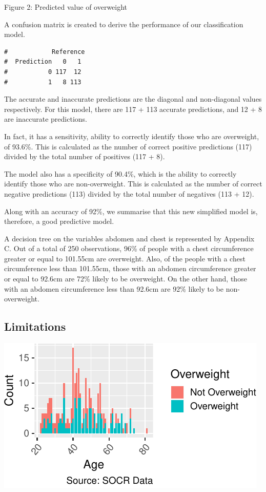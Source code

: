\documentclass[a4paper,9pt,twocolumn,twoside,]{pinp}
\begin{document}
Figure 2: Predicted value of overweight

A confusion matrix is created to derive the performance of our
classification model.

\begin{ShadedResult}
\begin{verbatim}
#            Reference
#  Prediction   0   1
#           0 117  12
#           1   8 113
\end{verbatim}
\end{ShadedResult}

The accurate and inaccurate predictions are the diagonal and
non-diagonal values respectively. For this model, there are 117 + 113
accurate predictions, and 12 + 8 are inaccurate predictions.

In fact, it has a sensitivity, ability to correctly identify those who
are overweight, of 93.6\%. This is calculated as the number of correct
positive predictions (117) divided by the total number of positives (117
+ 8).

The model also has a specificity of 90.4\%, which is the ability to
correctly identify those who are non-overweight. This is calculated as
the number of correct negative predictions (113) divided by the total
number of negatives (113 + 12).

Along with an accuracy of 92\%, we summarise that this new simplified
model is, therefore, a good predictive model.

A decision tree on the variables abdomen and chest is represented by
Appendix C. Out of a total of 250 observations, 96\% of people with a
chest circumference greater or equal to 101.55cm are overweight. Also,
of the people with a chest circumference less than 101.55cm, those with
an abdomen circumference greater or equal to 92.6cm are 72\% likely to
be overweight. On the other hand, those with an abdomen circumference
less than 92.6cm are 92\% likely to be non-overweight.

\hypertarget{limitations}{%
\subsection{Limitations}\label{limitations}}

\begin{center}\includegraphics{Executive_Report_files/figure-latex/unnamed-chunk-4-1} \end{center}
\end{document}

